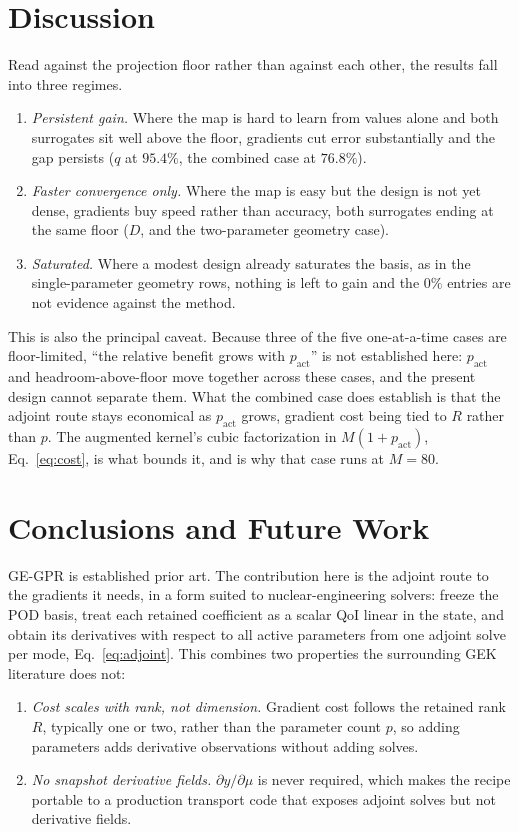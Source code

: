 \documentclass[]{ANStopical}
\begin{document}
\section{Discussion}\label{sec:discussion}

Read against the projection floor rather than against each other, the results fall into three regimes.
\begin{enumerate}
    \item \emph{Persistent gain.} Where the map is hard to learn from values alone and both surrogates sit well above the floor, gradients cut error substantially and the gap persists ($q$ at $95.4\%$, the combined case at $76.8\%$).
    \item \emph{Faster convergence only.} Where the map is easy but the design is not yet dense, gradients buy speed rather than accuracy, both surrogates ending at the same floor ($D$, and the two-parameter geometry case).
    \item \emph{Saturated.} Where a modest design already saturates the basis, as in the single-parameter geometry rows, nothing is left to gain and the $0\%$ entries are not evidence against the method.
\end{enumerate}

This is also the principal caveat. Because three of the five one-at-a-time cases are floor-limited, ``the relative benefit grows with $p_{\mathrm{act}}$'' is not established here: $p_{\mathrm{act}}$ and headroom-above-floor move together across these cases, and the present design cannot separate them. What the combined case does establish is that the adjoint route stays economical as $p_{\mathrm{act}}$ grows, gradient cost being tied to $R$ rather than $p$. The augmented kernel's cubic factorization in $M(1+p_{\mathrm{act}})$, Eq.~\eqref{eq:cost}, is what bounds it, and is why that case runs at $M=80$.

\section{Conclusions and Future Work}\label{sec:conclusions}

GE-GPR is established prior art. The contribution here is the adjoint route to the gradients it needs, in a form suited to nuclear-engineering solvers: freeze the POD basis, treat each retained coefficient as a scalar QoI linear in the state, and obtain its derivatives with respect to all active parameters from one adjoint solve per mode, Eq.~\eqref{eq:adjoint}. This combines two properties the surrounding GEK literature does not:
\begin{enumerate}
    \item \emph{Cost scales with rank, not dimension.} Gradient cost follows the retained rank $R$, typically one or two, rather than the parameter count $p$, so adding parameters adds derivative observations without adding solves.
    \item \emph{No snapshot derivative fields.} $\partial y/\partial\mu$ is never required, which makes the recipe portable to a production transport code that exposes adjoint solves but not derivative fields.
\end{enumerate}
\end{document}
